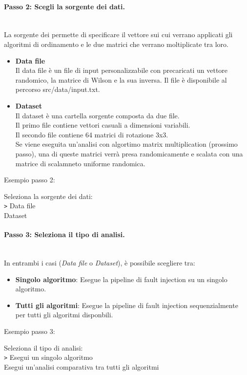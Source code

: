 \documentclass{article}
\begin{document}
\paragraph{Passo 2: Scegli la sorgente dei dati.}\leavevmode\\
La sorgente dei permette di specificare il vettore sui cui verrano applicati gli algoritmi di ordinamento e le due matrici che verrano moltiplicate tra loro.
\begin{itemize}
    \item \textbf{Data file} \\Il data file è un file di input personalizzabile con precaricati un vettore randomico, la matrice di Wilson e la sua inversa. Il file è disponibile al percorso src/data/input.txt.
    \item \textbf{Dataset} \\ Il dataset è una cartella sorgente composta da due file. \\Il primo file contiene vettori casuali a dimensioni variabili.\\ 
    Il secondo file contiene 64 matrici di rotazione 3x3. \\
    Se viene eseguita un'analisi con algortimo matrix multiplication (prossimo passo), una di queste matrici verrà presa randomicamente e scalata con una matrice di scalamneto uniforme randomica.
\end{itemize}
Esempio passo 2:
\begin{tcolorbox}[colback=black, coltext=white, sharp corners, boxrule=0.5mm, width=\textwidth]
    Seleziona la sorgente dei dati: \\
    \texttt{>} Data file \\
    \hspace{2.5em}Dataset
\end{tcolorbox}


\paragraph{Passo 3: Seleziona il tipo di analisi.}\leavevmode\\
In entrambi i casi (\textit{Data file} o \textit{Dataset}), è possibile scegliere tra:
\begin{itemize}
    \item \textbf{Singolo algoritmo}: Esegue la pipeline di fault injection su un singolo algoritmo.
    \item \textbf{Tutti gli algoritmi}: Esegue la pipeline di fault injection sequenzialmente per tutti gli algoritmi disponbili.
\end{itemize}
Esempio passo 3:
\begin{tcolorbox}[colback=black, coltext=white, sharp corners, boxrule=0.5mm, width=\textwidth]
    Seleziona il tipo di analisi: \\
    \texttt{>} Esegui un singolo algoritmo \\
    \hspace{2.5em}Esegui un'analisi comparativa tra tutti gli algoritmi
\end{tcolorbox}
\end{document}
